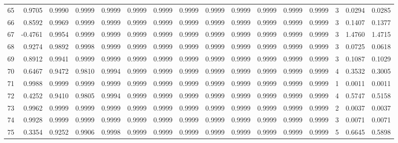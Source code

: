 \begin{tabular}{lrrrrrrrrrrrrrrr}
65  &      0.9705 &  0.9990 &  0.9999 &  0.9999 &  0.9999 &  0.9999 &  0.9999 &  0.9999 &  0.9999 &  0.9999 &   0.9999 &     0.9999 &      3 &                    0.0294 &                     0.0285 \\
66  &      0.8592 &  0.9969 &  0.9999 &  0.9999 &  0.9999 &  0.9999 &  0.9999 &  0.9999 &  0.9999 &  0.9999 &   0.9999 &     0.9999 &      3 &                    0.1407 &                     0.1377 \\
67  &     -0.4761 &  0.9954 &  0.9999 &  0.9999 &  0.9999 &  0.9999 &  0.9999 &  0.9999 &  0.9999 &  0.9999 &   0.9999 &     0.9999 &      3 &                    1.4760 &                     1.4715 \\
68  &      0.9274 &  0.9892 &  0.9998 &  0.9999 &  0.9999 &  0.9999 &  0.9999 &  0.9999 &  0.9999 &  0.9999 &   0.9999 &     0.9999 &      3 &                    0.0725 &                     0.0618 \\
69  &      0.8912 &  0.9941 &  0.9999 &  0.9999 &  0.9999 &  0.9999 &  0.9999 &  0.9999 &  0.9999 &  0.9999 &   0.9999 &     0.9999 &      3 &                    0.1087 &                     0.1029 \\
70  &      0.6467 &  0.9472 &  0.9810 &  0.9994 &  0.9999 &  0.9999 &  0.9999 &  0.9999 &  0.9999 &  0.9999 &   0.9999 &     0.9999 &      4 &                    0.3532 &                     0.3005 \\
71  &      0.9988 &  0.9999 &  0.9999 &  0.9999 &  0.9999 &  0.9999 &  0.9999 &  0.9999 &  0.9999 &  0.9999 &   0.9999 &     0.9999 &      1 &                    0.0011 &                     0.0011 \\
72  &      0.4252 &  0.9410 &  0.9805 &  0.9994 &  0.9999 &  0.9999 &  0.9999 &  0.9999 &  0.9999 &  0.9999 &   0.9999 &     0.9999 &      4 &                    0.5747 &                     0.5158 \\
73  &      0.9962 &  0.9999 &  0.9999 &  0.9999 &  0.9999 &  0.9999 &  0.9999 &  0.9999 &  0.9999 &  0.9999 &   0.9999 &     0.9999 &      2 &                    0.0037 &                     0.0037 \\
74  &      0.9928 &  0.9999 &  0.9999 &  0.9999 &  0.9999 &  0.9999 &  0.9999 &  0.9999 &  0.9999 &  0.9999 &   0.9999 &     0.9999 &      3 &                    0.0071 &                     0.0071 \\
75  &      0.3354 &  0.9252 &  0.9906 &  0.9998 &  0.9999 &  0.9999 &  0.9999 &  0.9999 &  0.9999 &  0.9999 &   0.9999 &     0.9999 &      5 &                    0.6645 &                     0.5898 \\

\end{tabular}
